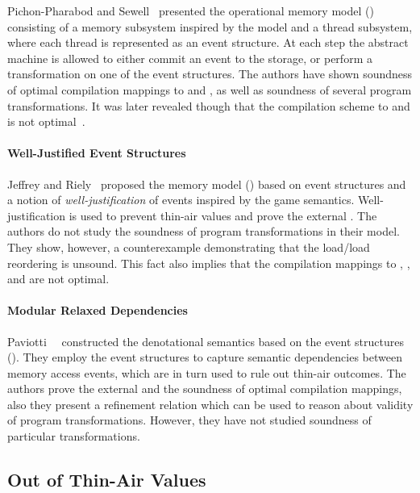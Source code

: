 Pichon-Pharabod and Sewell~\cite{PichonPharabod-Sewell:POPL16} 
presented the operational memory model (\CSRA) consisting of 
a memory subsystem inspired by the \POWER model 
and a thread subsystem, 
where each thread is represented as an event structure. 
At each step the abstract machine is allowed to either 
commit an event to the storage, or perform a transformation 
on one of the event structures. 
The authors have shown soundness of 
optimal compilation mappings to \Intel and \POWER, 
as well as soundness of several program transformations.
It was later revealed though that the compilation scheme
to  and  is not optimal~\cite{PichonPharabod:PhD18}.

\paragraph{Well-Justified Event Structures}

Jeffrey and Riely~\cite{Jeffrey-Riely:LICS16} proposed 
the memory model (\WJES) based on event structures and a notion of 
\emph{well-justification} of events inspired by the game semantics. 
Well-justification is used to prevent thin-air values 
and prove the external \DRF. The authors do not study 
the soundness of program transformations in their model. 
They show, however, a counterexample demonstrating that 
the load/load reordering is unsound. 
This fact also implies that 
the compilation mappings to , , and \POWER 
are not optimal.   

\paragraph{Modular Relaxed Dependencies}

Paviotti~\etal~\cite{Paviotti-al:ESOP20} constructed the 
denotational semantics based on the event structures (\MRD). 
They employ the event structures to capture 
semantic dependencies between memory access events, 
which are in turn used to rule out thin-air outcomes.
The authors prove the external \DRF and 
the soundness of optimal compilation mappings,
also they present a refinement relation which 
can be used to reason about validity of program transformations. 
However, they have not studied soundness of particular transformations. 

\subsection{Out of Thin-Air Values}

